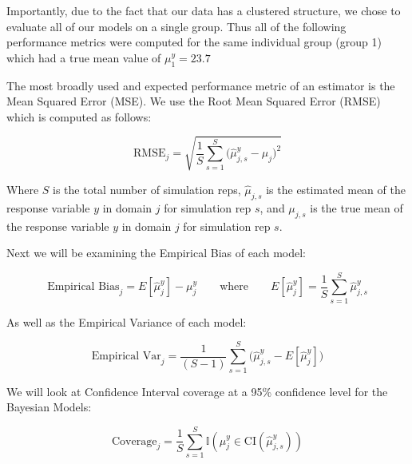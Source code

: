 \documentclass[12pt,twoside]{reedthesis}
\begin{document}
Importantly, due to the fact that our data has a clustered structure, we chose to evaluate all of our models on a single group. Thus all of the following performance metrics were computed for the same individual group (group 1) which had a true mean value of \(\mu^y_1 = 23.7\)

The most broadly used and expected performance metric of an estimator is the Mean Squared Error (MSE). We use the Root Mean Squared Error (RMSE) which is computed as follows:

\[
\text{RMSE}_j  = \sqrt{\frac{1}{S}\sum_{s = 1}^{S}\bigg(\hat{\mu}^y_{j, s} - \mu_{j}\bigg)^2}
\]

Where \(S\) is the total number of simulation reps, \(\hat{\mu}_{j, s}\) is the estimated mean of the response variable \(y\) in domain \(j\) for simulation rep \(s\), and \(\mu_{j, s}\) is the true mean of the response variable \(y\) in domain \(j\) for simulation rep \(s\).

Next we will be examining the Empirical Bias of each model:

\[
\text{Empirical Bias}_j = E[\hat{\mu}^y_j] - \mu^y_{j} \qquad \text{where} \qquad E[\hat{\mu}^y_j] = \frac{1}{S}\sum_{s = 1}^S\hat{\mu}^y_{j, s}
\]

As well as the Empirical Variance of each model:

\[
\text{Empirical Var}_j  = \frac{1}{(S-1)}\sum_{s = 1}^S\Big(\hat{\mu}^y_{j,s} - E[\hat{\mu}^y_j]\Big)
\]

We will look at Confidence Interval coverage at a 95\% confidence level for the Bayesian Models:

\[
\text{Coverage}_j = \frac{1}{S}\sum_{s = 1}^S \mathbb{I}(\mu^y_{j} \in \text{CI}(\hat{\mu}^y_{j, s}))
\]
\end{document}
